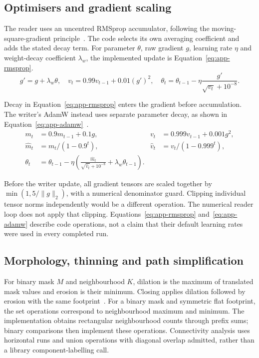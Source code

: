 \subsection{Optimisers and gradient scaling}
The reader uses an uncentred RMSprop accumulator, following the moving-square-gradient principle~\cite[PDF p.~29]{tieleman2012}. The code selects its own averaging coefficient and adds the stated decay term. For parameter $\theta$, raw gradient $g$, learning rate $\eta$ and weight-decay coefficient $\lambda_w$, the implemented update is Equation~\ref{eq:app-rmsprop}.
\begin{equation}
g' =g+\lambda_w\theta,\quad
v_t=0.99v_{t-1}+0.01(g')^2,\quad
\theta_t=\theta_{t-1}-\eta\frac{g'}{\sqrt{v_t}+10^{-8}}.
\label{eq:app-rmsprop}
\end{equation}


Decay in Equation~\ref{eq:app-rmsprop} enters the gradient before accumulation. The writer's AdamW instead uses separate parameter decay, as shown in Equation~\ref{eq:app-adamw}~\cite[p.~2, Alg.~1]{kingma2015}\cite[p.~3, Alg.~2]{loshchilov2019}.
\begin{equation}
\begin{aligned}
m_t&=0.9m_{t-1}+0.1g,& v_t&=0.999v_{t-1}+0.001g^2,\\
\widehat m_t&=m_t/(1-0.9^t),&\widehat v_t&=v_t/(1-0.999^t),\\
\theta_t&=\theta_{t-1}-\eta\left(\frac{\widehat m_t}{\sqrt{\widehat v_t}+10^{-8}}+\lambda_w\theta_{t-1}\right).
\end{aligned}
\label{eq:app-adamw}
\end{equation}


Before the writer update, all gradient tensors are scaled together by $\min(1,5/\|g\|_2)$, with a numerical denominator guard. Clipping individual tensor norms independently would be a different operation. The numerical reader loop does not apply that clipping. Equations~\ref{eq:app-rmsprop} and~\ref{eq:app-adamw} describe code operations, not a claim that their default learning rates were used in every completed run.

\subsection{Morphology, thinning and path simplification}
For binary mask $M$ and neighbourhood $K$, dilation is the maximum of translated mask values and erosion is their minimum. Closing applies dilation followed by erosion with the same footprint~\cite[pp.~533, 541, Defs.~1, 36]{haralick1987}. For a binary mask and symmetric flat footprint, the set operations correspond to neighbourhood maximum and minimum. The implementation obtains rectangular neighbourhood counts through prefix sums; binary comparisons then implement these operations. Connectivity analysis uses horizontal runs and union operations with diagonal overlap admitted, rather than a library component-labelling call.


